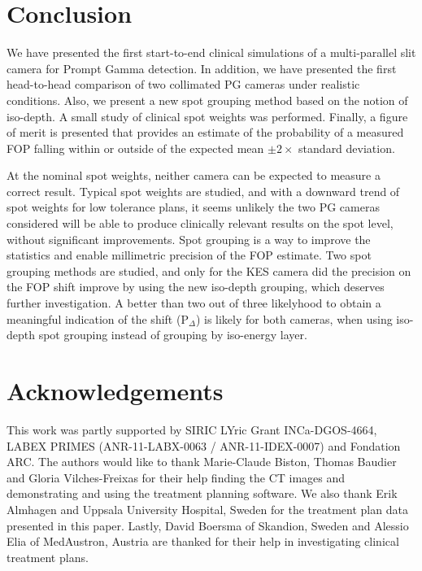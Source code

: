 \documentclass[a4paper,english]{article}
\begin{document}
\section{Conclusion}

We have presented the first start-to-end clinical simulations of a multi-parallel slit camera for Prompt Gamma detection. In addition, we have presented the first head-to-head comparison of two collimated PG cameras under realistic conditions. Also, we present a new spot grouping method based on the notion of iso-depth. A small study of clinical spot weights was performed. Finally, a figure of merit is presented that provides an estimate of the probability of a measured FOP falling within or outside of the expected mean $\pm 2\times$ standard deviation.

At the nominal spot weights, neither camera can be expected to measure a correct result. Typical spot weights are studied, and with a downward trend of spot weights for low tolerance plans, it seems unlikely the two PG cameras considered will be able to produce clinically relevant results on the spot level, without significant improvements. Spot grouping is a way to improve the statistics and enable millimetric precision of the FOP estimate. Two spot grouping methods are studied, and only for the KES camera did the precision on the FOP shift improve by using the new iso-depth grouping, which deserves further investigation. A better than two out of three likelyhood to obtain a meaningful indication of the shift (P$_\Delta$) is likely for both cameras, when using iso-depth spot grouping instead of grouping by iso-energy layer.

\section{Acknowledgements}

This work was partly supported by SIRIC LYric Grant INCa-DGOS-4664, LABEX PRIMES (ANR-11-LABX-0063 / ANR-11-IDEX-0007) and Fondation ARC. The authors would like to thank Marie-Claude Biston, Thomas Baudier and Gloria Vilches-Freixas for their help finding the CT images and demonstrating and using the treatment planning software. We also thank Erik Almhagen and Uppsala University Hospital, Sweden for the treatment plan data presented in this paper. Lastly, David Boersma of Skandion, Sweden and Alessio Elia of MedAustron, Austria are thanked for their help in investigating clinical treatment plans.
\end{document}
